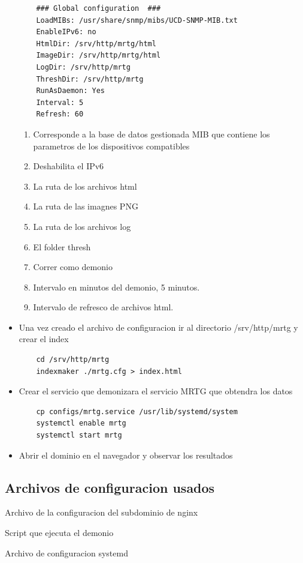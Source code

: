 \documentclass[letterpaper]{article}
\begin{document}
\begin{itemize}
  \begin{lstlisting}
    ### Global configuration  ###
    LoadMIBs: /usr/share/snmp/mibs/UCD-SNMP-MIB.txt
    EnableIPv6: no
    HtmlDir: /srv/http/mrtg/html
    ImageDir: /srv/http/mrtg/html
    LogDir: /srv/http/mrtg
    ThreshDir: /srv/http/mrtg
    RunAsDaemon: Yes
    Interval: 5
    Refresh: 60
  \end{lstlisting}
  \begin{enumerate}
    \item Corresponde a la base de datos gestionada MIB que contiene los parametros de los dispositivos compatibles
    \item Deshabilita el IPv6
    \item La ruta de los archivos html
    \item La ruta de las imagnes PNG
    \item La ruta de los archivos log
    \item El folder thresh
    \item Correr como demonio
    \item Intervalo en minutos del demonio, 5 minutos.
    \item Intervalo de refresco de archivos html.
  \end{enumerate}
  \item Una vez creado el archivo de configuracion ir al directorio /srv/http/mrtg y crear el index
  \begin{lstlisting}
    cd /srv/http/mrtg
    indexmaker ./mrtg.cfg > index.html
  \end{lstlisting}
  \item Crear el servicio que demonizara el servicio MRTG que obtendra los datos
  \begin{lstlisting}
    cp configs/mrtg.service /usr/lib/systemd/system
    systemctl enable mrtg
    systemctl start mrtg
  \end{lstlisting}
  \item Abrir el dominio en el navegador y observar los resultados
\end{itemize}
\subsection{Archivos de configuracion usados} %
\label{sub:Archivos de configuracion usados}
Archivo de la configuracion del subdominio de nginx

Script que ejecuta el demonio

Archivo de configuracion systemd


\newpage{}

\printglossary[type=\acronymtype]

\printglossary{}
\end{document}

